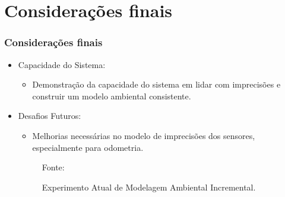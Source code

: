 \documentclass[xcolor=dvipsnames, aspectratio=169]{beamer}
\begin{document}
\section{Considerações finais}
  \begin{frame}
  \frametitle{Considerações finais}
  \begin{itemize}
      \item Capacidade do Sistema:
      \begin{itemize}
        \item Demonstração da capacidade do sistema em lidar com imprecisões e construir um modelo ambiental consistente.
      \end{itemize}
      \item Desafios Futuros:
      \begin{itemize}
        \item Melhorias necessárias no modelo de imprecisões dos sensores, especialmente para odometria.
      \end{itemize}
      \begin{figure}
        \centering
        {Fonte: \cite{buniyamin2011simple}}
        \caption{Experimento Atual de Modelagem Ambiental Incremental.}
        \label{fig:8}
      \end{figure}


  \end{itemize}
\end{frame}
\end{document}
